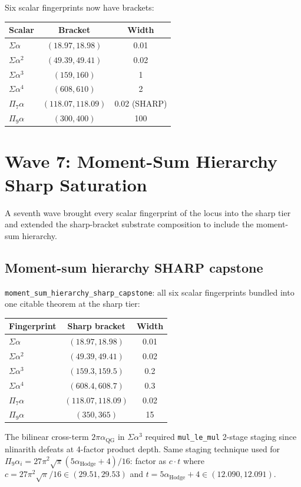Six scalar fingerprints now have brackets:
\begin{tabular}{|l|c|c|}
\hline
Scalar & Bracket & Width \\
\hline
$\Sigma \alpha$  & $(18.97, 18.98)$        & 0.01 \\
$\Sigma \alpha^2$ & $(49.39, 49.41)$        & 0.02 \\
$\Sigma \alpha^3$ & $(159, 160)$            & 1 \\
$\Sigma \alpha^4$ & $(608, 610)$            & 2 \\
$\Pi_{7} \alpha$  & $(118.07, 118.09)$      & 0.02 (SHARP) \\
$\Pi_{9} \alpha$  & $(300, 400)$            & 100 \\
\hline
\end{tabular}

\section{Wave 7: Moment-Sum Hierarchy Sharp Saturation}
\label{sec:wave7-2026-06-16}

A seventh wave brought every scalar fingerprint of the locus into the
sharp tier and extended the sharp-bracket substrate composition to
include the moment-sum hierarchy.

\subsection{Moment-sum hierarchy SHARP capstone}

\verb|moment_sum_hierarchy_sharp_capstone|: all six scalar
fingerprints bundled into one citable theorem at the sharp tier:

\begin{tabular}{|l|c|c|}
\hline
Fingerprint & Sharp bracket & Width \\
\hline
$\Sigma \alpha$  & $(18.97, 18.98)$        & 0.01 \\
$\Sigma \alpha^2$ & $(49.39, 49.41)$        & 0.02 \\
$\Sigma \alpha^3$ & $(159.3, 159.5)$        & 0.2  \\
$\Sigma \alpha^4$ & $(608.4, 608.7)$        & 0.3  \\
$\Pi_{7} \alpha$  & $(118.07, 118.09)$      & 0.02 \\
$\Pi_{9} \alpha$  & $(350, 365)$            & 15   \\
\hline
\end{tabular}

The bilinear cross-term $2\pi \alpha_{\text{QG}}$ in $\Sigma \alpha^3$
required \verb|mul_le_mul| 2-stage staging since nlinarith defeats at
4-factor product depth. Same staging technique used for $\Pi_{9}
\alpha_i = 27 \pi^2 \sqrt{\pi} (5\alpha_{\text{Hodge}} + 4)/16$:
factor as $c \cdot t$ where $c = 27 \pi^2 \sqrt{\pi}/16 \in
(29.51, 29.53)$ and $t = 5\alpha_{\text{Hodge}} + 4 \in (12.090, 12.091)$.

